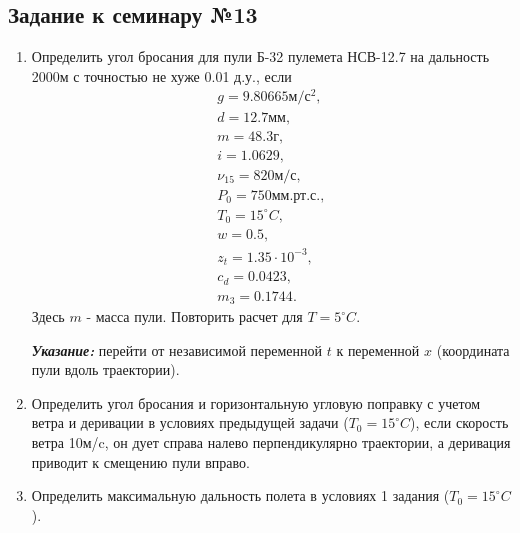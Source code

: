 \subsection{Задание к семинару №13}
\begin{enumerate}
\item Определить угол бросания для пули Б-32 пулемета НСВ-12.7 на дальность 2000м с точностью не хуже 0.01 д.у., если
\begin{equation} \nonumber
	\begin{split}
		g = 9.80665 \textit{м}/\textit{с}^2, \\
		d = 12.7 \textit{мм}, \\
		m = 48.3 \textit{г}, \\
		i = 1.0629, \\
		\nu_{15} = 820 \textit{м}/\textit{с}, \\
		P_0 = 750 \textit{мм.рт.с.}, \\
		T_0 = 15^\circ C, \\
		w = 0.5, \\
		z_t = 1.35 \cdot 10^{-3}, \\
		c_d = 0.0423, \\
		m_3 = 0.1744.
	\end{split}
\end{equation}
Здесь $m$ - масса пули. Повторить расчет для  $T = 5^\circ C$.

\textbf{\textit{Указание:}} перейти от независимой переменной $t$ к переменной $x$ (координата пули вдоль траектории).

\item Определить угол бросания и горизонтальную угловую поправку с учетом ветра и деривации в условиях предыдущей задачи ($T_0 = 15^\circ C$), если скорость ветра 10м/c, он дует справа налево перпендикулярно траектории, а деривация приводит к смещению пули вправо.

\item Определить максимальную дальность полета в условиях 1 задания ($T_0 = 15^\circ C$).
\end{enumerate}

